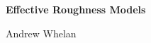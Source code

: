 \documentclass{article}
\begin{document}
\renewcommand{\thesection}{\Alph{section}}
\begin{titlepage}
   \centering
   \vspace*{\fill}  %

   {\Huge\bfseries Effective Roughness Models \par}
   \vspace{1cm}

   {\Large Andrew Whelan \par}
   \vspace{0.5cm}

   {\large \date{\today} \par}

   \tableofcontents
   \vspace*{\fill}  %
\end{titlepage}

%
\setcounter{section}{13} %
\setcounter{subsection}{-1}
\setcounter{equation}{0}
\end{document}
